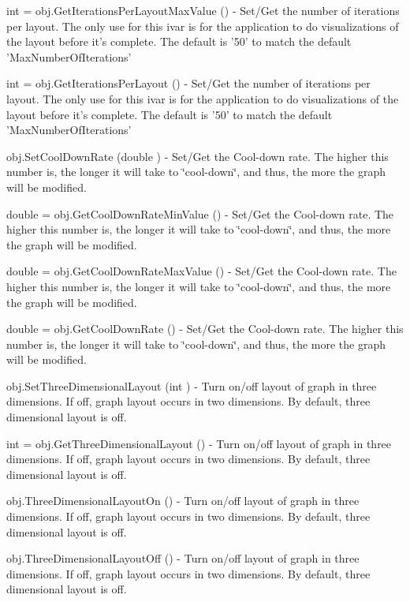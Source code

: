 \begin{DoxyItemize}
\item {\ttfamily int = obj.\-Get\-Iterations\-Per\-Layout\-Max\-Value ()} -\/ Set/\-Get the number of iterations per layout. The only use for this ivar is for the application to do visualizations of the layout before it's complete. The default is '50' to match the default 'Max\-Number\-Of\-Iterations'  
\item {\ttfamily int = obj.\-Get\-Iterations\-Per\-Layout ()} -\/ Set/\-Get the number of iterations per layout. The only use for this ivar is for the application to do visualizations of the layout before it's complete. The default is '50' to match the default 'Max\-Number\-Of\-Iterations'  
\item {\ttfamily obj.\-Set\-Cool\-Down\-Rate (double )} -\/ Set/\-Get the Cool-\/down rate. The higher this number is, the longer it will take to \char`\"{}cool-\/down\char`\"{}, and thus, the more the graph will be modified.  
\item {\ttfamily double = obj.\-Get\-Cool\-Down\-Rate\-Min\-Value ()} -\/ Set/\-Get the Cool-\/down rate. The higher this number is, the longer it will take to \char`\"{}cool-\/down\char`\"{}, and thus, the more the graph will be modified.  
\item {\ttfamily double = obj.\-Get\-Cool\-Down\-Rate\-Max\-Value ()} -\/ Set/\-Get the Cool-\/down rate. The higher this number is, the longer it will take to \char`\"{}cool-\/down\char`\"{}, and thus, the more the graph will be modified.  
\item {\ttfamily double = obj.\-Get\-Cool\-Down\-Rate ()} -\/ Set/\-Get the Cool-\/down rate. The higher this number is, the longer it will take to \char`\"{}cool-\/down\char`\"{}, and thus, the more the graph will be modified.  
\item {\ttfamily obj.\-Set\-Three\-Dimensional\-Layout (int )} -\/ Turn on/off layout of graph in three dimensions. If off, graph layout occurs in two dimensions. By default, three dimensional layout is off.  
\item {\ttfamily int = obj.\-Get\-Three\-Dimensional\-Layout ()} -\/ Turn on/off layout of graph in three dimensions. If off, graph layout occurs in two dimensions. By default, three dimensional layout is off.  
\item {\ttfamily obj.\-Three\-Dimensional\-Layout\-On ()} -\/ Turn on/off layout of graph in three dimensions. If off, graph layout occurs in two dimensions. By default, three dimensional layout is off.  
\item {\ttfamily obj.\-Three\-Dimensional\-Layout\-Off ()} -\/ Turn on/off layout of graph in three dimensions. If off, graph layout occurs in two dimensions. By default, three dimensional layout is off.  

\end{DoxyItemize}
